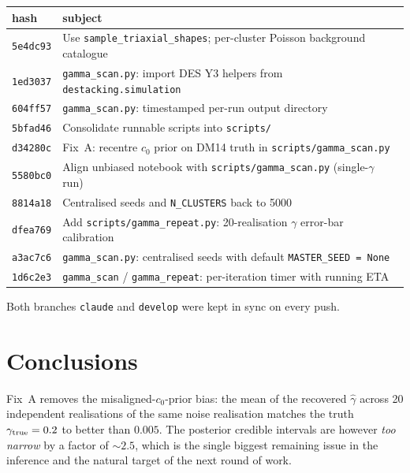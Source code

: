 \documentclass[11pt,a4paper]{article}
\begin{document}
\begin{footnotesize}
\begin{tabular}{ll}
\toprule
hash & subject \\
\midrule
\texttt{5e4dc93} & Use \texttt{sample\_triaxial\_shapes}; per-cluster Poisson background catalogue \\
\texttt{1ed3037} & \texttt{gamma\_scan.py}: import DES Y3 helpers from \texttt{destacking.simulation} \\
\texttt{604ff57} & \texttt{gamma\_scan.py}: timestamped per-run output directory \\
\texttt{5bfad46} & Consolidate runnable scripts into \texttt{scripts/} \\
\texttt{d34280c} & Fix~A: recentre $c_0$ prior on DM14 truth in \texttt{scripts/gamma\_scan.py} \\
\texttt{5580bc0} & Align unbiased notebook with \texttt{scripts/gamma\_scan.py} (single-$\gamma$ run) \\
\texttt{8814a18} & Centralised seeds and \texttt{N\_CLUSTERS} back to 5000 \\
\texttt{dfea769} & Add \texttt{scripts/gamma\_repeat.py}: 20-realisation $\gamma$ error-bar calibration \\
\texttt{a3ac7c6} & \texttt{gamma\_scan.py}: centralised seeds with default \texttt{MASTER\_SEED = None} \\
\texttt{1d6c2e3} & \texttt{gamma\_scan} / \texttt{gamma\_repeat}: per-iteration timer with running ETA \\
\bottomrule
\end{tabular}
\end{footnotesize}

Both branches \texttt{claude} and \texttt{develop} were kept in sync on every
push.

\section*{Conclusions}

Fix~A removes the misaligned-$c_0$-prior bias: the mean of the recovered
$\hat\gamma$ across 20 independent realisations of the same noise realisation
matches the truth $\gamma_{\rm true} = 0.2$ to better than $0.005$.  The
posterior credible intervals are however \emph{too narrow} by a factor of
$\sim 2.5$, which is the single biggest remaining issue in the inference and
the natural target of the next round of work.
\end{document}
